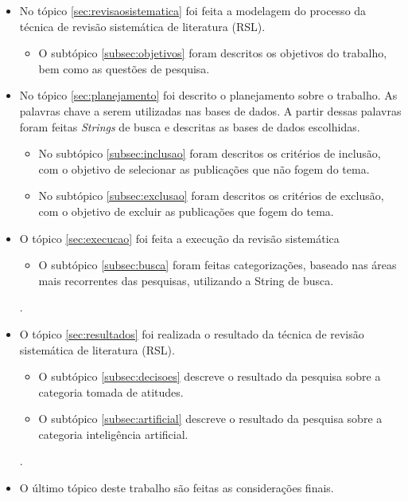 \begin{itemize}
	\item No tópico \ref{sec:revisaosistematica} foi feita a modelagem do processo da técnica de revisão sistemática de literatura (RSL).
		\begin{itemize}
		\item O subtópico \ref{subsec:objetivos} foram descritos os objetivos do trabalho, bem como as questões de pesquisa.
		\end{itemize}
	\item No tópico \ref{sec:planejamento} foi descrito o planejamento sobre o trabalho. As palavras chave a serem utilizadas nas bases de dados. A partir dessas palavras foram feitas \textit{Strings} de busca e descritas as bases de dados escolhidas.
		\begin{itemize}
		\item No subtópico \ref{subsec:inclusao} foram descritos os critérios de inclusão, com o objetivo de selecionar as publicações que não fogem do tema.
		\item No subtópico \ref{subsec:exclusao} foram descritos os critérios de exclusão, com o objetivo de excluir as publicações que fogem do tema.
		\end{itemize}
	\item O tópico \ref{sec:execucao} foi feita a execução da revisão sistemática
		\begin{itemize}
		\item O subtópico \ref{subsec:busca} foram feitas categorizações, baseado nas áreas mais recorrentes das pesquisas, utilizando a String de busca.
		\end{itemize}.
	\item O tópico \ref{sec:resultados} foi realizada o resultado da técnica de revisão sistemática de literatura (RSL).
		\begin{itemize}
		\item O subtópico \ref{subsec:decisoes} descreve o resultado da pesquisa sobre a categoria tomada de atitudes.
		\item O subtópico \ref{subsec:artificial} descreve o resultado da pesquisa sobre a categoria inteligência artificial.
		\end{itemize}.
		\item O último tópico deste trabalho são feitas as considerações finais.
\end{itemize}